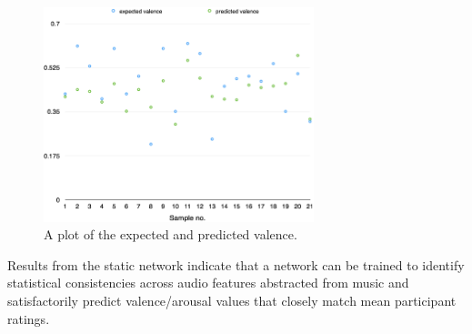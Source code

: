 \begin{figure}[t]
    \includegraphics[width=0.7\textwidth]{Figures/finalvalence}
    \centering

  \caption{A plot of the expected and predicted valence.}
  \label{fig:anneval}
\end{figure}


Results from the static network indicate that a network can be trained to identify statistical consistencies across audio features abstracted from music and satisfactorily predict valence/arousal values that closely match mean participant ratings.


